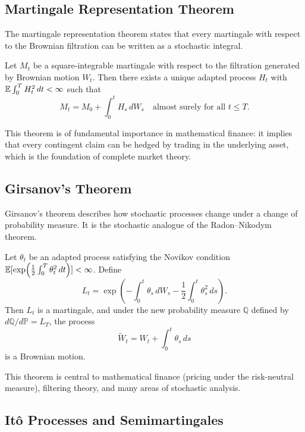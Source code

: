 \subsection{Martingale Representation Theorem}

The martingale representation theorem states that every martingale with respect to the Brownian filtration can be written as a stochastic integral.

\begin{theorem}
Let \(M_t\) be a square-integrable martingale with respect to the filtration generated by Brownian motion \(W_t\). Then there exists a unique adapted process \(H_t\) with \(\mathbb{E}\int_0^T H_t^2 \, dt < \infty\) such that
\[
M_t = M_0 + \int_0^t H_s \, dW_s \quad \text{almost surely for all } t \leq T.
\]
\end{theorem}

This theorem is of fundamental importance in mathematical finance: it implies that every contingent claim can be hedged by trading in the underlying asset, which is the foundation of complete market theory.

\subsection{Girsanov's Theorem}

Girsanov's theorem describes how stochastic processes change under a change of probability measure. It is the stochastic analogue of the Radon--Nikodym theorem.

\begin{theorem}
Let \(\theta_t\) be an adapted process satisfying the Novikov condition \(\mathbb{E}[\exp(\frac12 \int_0^T \theta_t^2 \, dt)] < \infty\). Define
\[
L_t = \exp\left(-\int_0^t \theta_s \, dW_s - \frac12 \int_0^t \theta_s^2 \, ds\right).
\]
Then \(L_t\) is a martingale, and under the new probability measure \(\mathbb{Q}\) defined by \(d\mathbb{Q}/d\mathbb{P} = L_T\), the process
\[
\widetilde{W}_t = W_t + \int_0^t \theta_s \, ds
\]
is a Brownian motion.
\end{theorem}

This theorem is central to mathematical finance (pricing under the risk-neutral measure), filtering theory, and many areas of stochastic analysis.

\subsection{It\^{o} Processes and Semimartingales}

